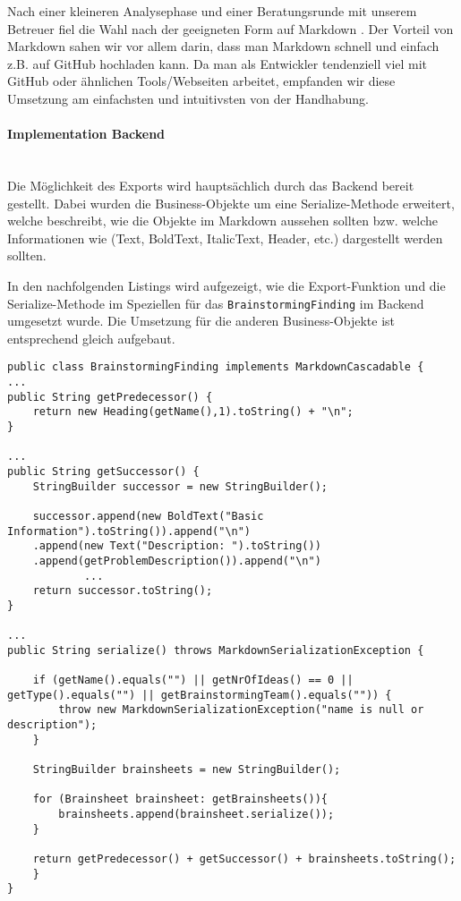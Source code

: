 Nach einer kleineren Analysephase und einer Beratungsrunde mit unserem Betreuer fiel die Wahl nach der geeigneten Form auf Markdown \cite{markdown}. Der Vorteil von Markdown sahen wir vor allem darin, dass man Markdown schnell und einfach z.B. auf GitHub hochladen kann. Da man als Entwickler tendenziell viel mit GitHub oder ähnlichen Tools/Webseiten arbeitet, empfanden wir diese Umsetzung am  einfachsten und intuitivsten von der Handhabung.

\paragraph*{Implementation Backend}~\\
Die Möglichkeit des Exports wird hauptsächlich durch das Backend bereit gestellt. Dabei wurden die Business-Objekte um eine Serialize-Methode erweitert, welche beschreibt, wie die Objekte im Markdown aussehen sollten bzw. welche Informationen wie (Text, BoldText, ItalicText, Header, etc.) dargestellt werden sollten. 

In den nachfolgenden Listings wird aufgezeigt, wie die Export-Funktion und die Serialize-Methode im Speziellen für das \texttt{BrainstormingFinding} im Backend umgesetzt wurde. Die Umsetzung für die anderen Business-Objekte ist entsprechend gleich aufgebaut. 

\begin{lstlisting}[caption={Serialize-Methode von BrainstormingFinding}, label=markdownBrainstormingFinding]
public class BrainstormingFinding implements MarkdownCascadable {
...
public String getPredecessor() {
    return new Heading(getName(),1).toString() + "\n";
}

...
public String getSuccessor() {
    StringBuilder successor = new StringBuilder();

    successor.append(new BoldText("Basic Information").toString()).append("\n")
    .append(new Text("Description: ").toString())
    .append(getProblemDescription()).append("\n")
            ...
    return successor.toString();
}

...
public String serialize() throws MarkdownSerializationException {

    if (getName().equals("") || getNrOfIdeas() == 0 || getType().equals("") || getBrainstormingTeam().equals("")) {
        throw new MarkdownSerializationException("name is null or description");
    }

    StringBuilder brainsheets = new StringBuilder();

    for (Brainsheet brainsheet: getBrainsheets()){
        brainsheets.append(brainsheet.serialize());
    }
    
    return getPredecessor() + getSuccessor() + brainsheets.toString();
	}
}

\end{lstlisting}

